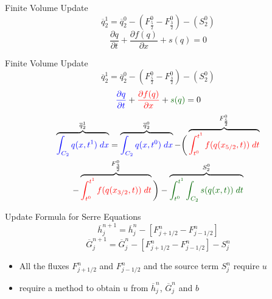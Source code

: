 \documentclass[handout]{beamer}
\begin{document}
\begin{frame}{Finite Volume Update}
	\begin{equation*}
	\overline{q}^1_2 = \overline{q}^0_2 - \left(F^0_{\frac{5}{2}} - F^0_{\frac{3}{2}}\right) - \left(S^0_2\right)
	\end{equation*}	
	\pause
	\begin{equation*}
	\frac{\partial q}{\partial t} + \frac{\partial f(q)}{\partial x} + s(q) = 0
	\end{equation*}	
\end{frame}
\begin{frame}{Finite Volume Update}	
	\begin{equation*}
	\overline{q}^1_2 = \overline{q}^0_2 - \left(F^0_{\frac{5}{2}} - F^0_{\frac{3}{2}}\right) - \left(S^0_2\right)
	\end{equation*}	
	\begin{equation*}
	{\color{blue}\frac{\partial q}{\partial t}} + {\color{red}\frac{\partial f(q)}{\partial x} } + {\color{green!40!black} s(q) } = 0
	\end{equation*}	
	\pause
	\begin{multline*}
	\overbrace{ {\color{blue}\int_{C_2} q(x,t^1) \; dx}}^{\overline{q}^1_2} = \overbrace{ {\color{blue}\int_{C_2} q(x,t^0) \; dx } }^{\overline{q}^0_2} -  \bigg( \overbrace{ {\color{red}\int_{t^0}^{t^1} f(q(x_{5/2},t)) \; dt}}^{F^0_{\frac{5}{2}}} \\- \overbrace{{\color{red}\int_{t^0}^{t^1} f(q(x_{3/2},t)) \; dt}}^{F^0_{\frac{3}{2}}}  \bigg) -  \overbrace{ {\color{green!40!black}\int_{t^0}^{t^1} \int_{C_2} s(q(x,t)) \; dt }}^{S^0_{2}}
	\end{multline*}
\end{frame}



\begin{frame}{Update Formula for Serre Equations}
	\begin{equation*}
	\overline{h}_j^{n+1} = \overline{h}_j^n -  \left[F_{j + 1/2}^n - F_{j - 1/2}^n \right]
	\end{equation*}
	\begin{equation*}
	\overline{G}_j^{n+1}  = \overline{G}_j^n -  \left[F_{j + 1/2}^n - F_{j - 1/2}^n \right] -  S^n_j
	\end{equation*}
	\pause
	\begin{itemize}
		\item All the fluxes $F^n_{j + 1/2}$ and $F^n_{j - 1/2}$ and the source term $ S^n_j$ require $u$
		\item require a method to obtain $u$ from $\overline{h}^n_j $, $\overline{G}^n_j $ and $b$
	\end{itemize}
	
\end{frame}
\end{document}
